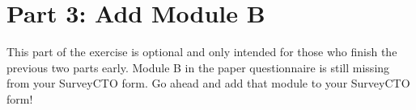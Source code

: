 \documentclass{tufte-handout}
\begin{document}
\section{Part 3: Add Module B}

This part of the exercise is optional and only intended for those who finish the previous two parts early. Module B in the paper questionnaire is still missing from your SurveyCTO form. Go ahead and add that module to your SurveyCTO form! 
\end{document}
